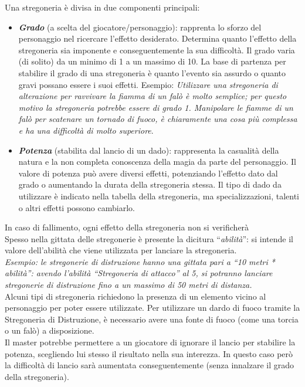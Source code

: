 \documentclass[../manuale_main.tex]{subfiles}
\begin{document}
Una stregoneria è divisa in due componenti principali:
\begin{itemize}
\item \emph{\textbf{Grado}} (a scelta del giocatore/personaggio): rapprenta lo sforzo del personaggio nel ricercare l'effetto desiderato. Determina quanto l'effetto della stregoneria sia imponente e conseguentemente la sua difficoltà. Il grado varia (di solito) da un minimo di 1 a un massimo di 10. La base di partenza per stabilire il grado di una stregoneria è quanto l’evento sia assurdo o quanto gravi possano essere i suoi effetti. Esempio: \emph{Utilizzare una stregoneria di alterazione per ravvivare la fiamma di un falò è molto semplice; per questo motivo la stregoneria potrebbe essere di grado 1. Manipolare le fiamme di un falò per scatenare un tornado di fuoco, è chiaramente una cosa più complessa e ha una difficoltà di molto superiore}.
\item \emph{\textbf{Potenza}} (stabilita dal lancio di un dado): rappresenta la casualità della natura e la non completa conoscenza della magia da parte del personaggio. Il valore di potenza può avere diversi effetti, potenziando l'effetto dato dal grado o aumentando la durata della stregoneria stessa. Il tipo di dado da utilizzare è indicato nella tabella della stregoneria, ma specializzazioni, talenti o altri effetti possono cambiarlo.
\end{itemize}
In caso di fallimento, ogni effetto della stregoneria non si verificherà\\
Spesso nella gittata delle stregonerie è presente la dicitura ``\emph{abilità}'': si intende il valore dell'abilità che viene utilizzata per lanciare la stregoneria.\\
\emph{Esempio: le stregonerie di distruzione hanno una gittata pari a ``10 metri * abilità'': avendo l'abilità ``Stregoneria di attacco'' al 5, si potranno lanciare stregonerie di distruzione fino a un massimo di 50 metri di distanza.}\\
Alcuni tipi di stregoneria richiedono la presenza di un elemento vicino al personaggio per poter essere utilizzate. Per utilizzare un dardo di fuoco tramite la Stregoneria di Distruzione, è necessario avere una fonte di fuoco (come una torcia o un falò) a disposizione.\\
Il master potrebbe permettere a un giocatore di ignorare il lancio per stabilire la potenza, scegliendo lui stesso il risultato nella sua interezza. In questo caso però la difficoltà di lancio sarà aumentata conseguentemente (senza innalzare il grado della stregoneria).\\
\end{document}
